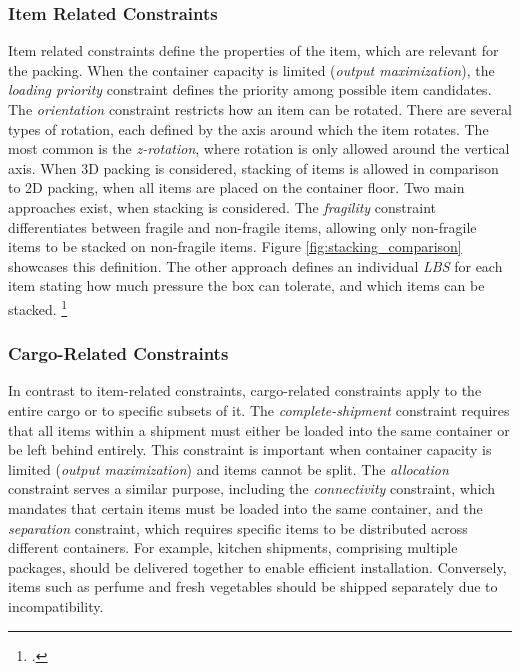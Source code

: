 \subsubsection{Item Related Constraints}
Item related constraints define the properties of the item, which are relevant
for the packing. When the container capacity is limited (\textit{output maximization}),
the \textit{loading priority} constraint defines the priority among possible
item candidates. The \textit{orientation} constraint restricts how an item can be rotated.
There are several types of rotation, each defined by the axis around which the item rotates.
The most common is the \textit{z-rotation}, where rotation is only allowed around the vertical axis.
When 3D packing is considered, stacking of items is allowed in comparison to 2D packing, when all
items are placed on the container floor. Two main approaches exist, when stacking is considered.
The \textit{fragility} constraint differentiates between fragile and non-fragile items,
allowing only non-fragile items to be stacked on non-fragile items. Figure \ref{fig:stacking_comparison} showcases
this definition. The other approach defines an individual \textit{\gls{LBS}} for each
item stating how much pressure the box can tolerate, and which items can be stacked. \footcite[cf.][p. 847f]{krebs_advanced_2021}



\subsubsection{Cargo-Related Constraints}
In contrast to item-related constraints, cargo-related constraints apply to
the entire cargo or to specific subsets of it. The \textit{complete-shipment} constraint
requires that all items within a shipment must either be loaded into the same
container or be left behind entirely. This constraint is important
when container capacity is limited (\textit{output maximization}) and items
cannot be split. The \textit{allocation} constraint serves a similar purpose,
including the \textit{connectivity} constraint, which mandates that
certain items must be loaded into the same container, and the
\textit{separation} constraint, which requires specific items to
be distributed across different containers. For example, kitchen
shipments, comprising multiple packages, should be delivered together
to enable efficient installation. Conversely, items such as perfume and fresh
vegetables should be shipped separately due to incompatibility.

